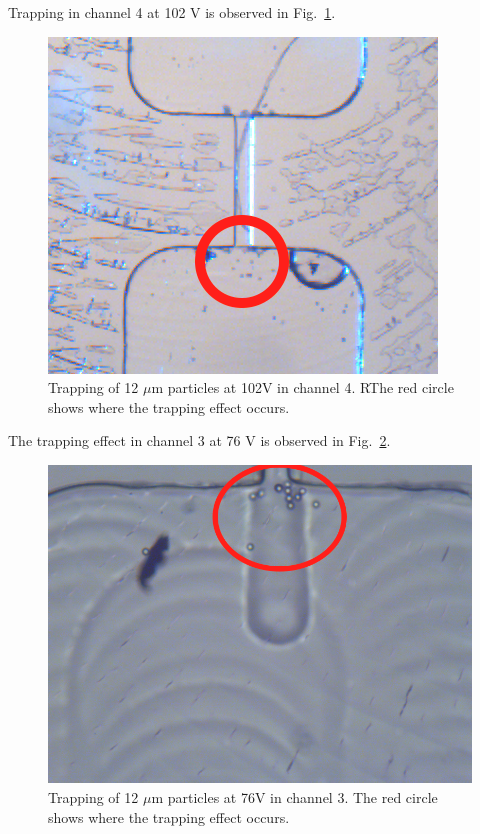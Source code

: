 \documentclass[journal, a4paper]{IEEEtran}
\begin{document}
Trapping in channel 4 at 102 V is observed in Fig.~\ref{fig:4-102V}.

\begin{figure}[!hbt]
	\begin{center}
		\includegraphics[width=\columnwidth]{images/4-102V.png}
		\caption{\label{fig:4-102V} Trapping of 12 $\mu$m particles at 102V in channel 4. RThe red circle shows where the trapping effect occurs.}
	\end{center}
\end{figure}

The trapping effect in channel 3 at 76 V is observed in Fig.~\ref{fig:3-76V}.
\begin{figure}[!hbt]
	\begin{center}
		\includegraphics[width=\columnwidth]{images/3-76V.png}
		\caption{\label{fig:3-76V} Trapping of 12 $\mu$m particles at 76V in channel 3. The red circle shows where the trapping effect occurs.}
	\end{center}
\end{figure}
\end{document}
